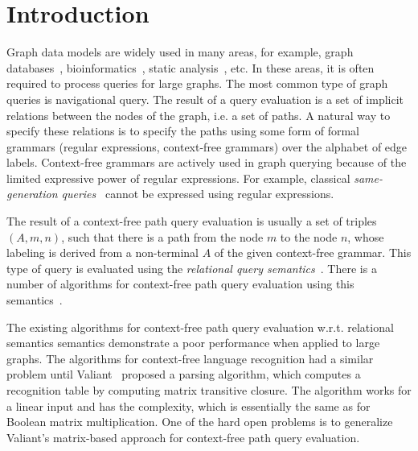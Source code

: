 \section{Introduction}

Graph data models are widely used in many areas, for example, graph databases~\cite{graphDB}, bioinformatics~\cite{Bio}, static analysis~\cite{XXX}, etc. In these areas, it is often required to process queries for large graphs. The most common type of graph queries is navigational query. The result of a query evaluation is a set of implicit relations between the nodes of the graph, i.e. a set of paths. A natural way to specify these relations is to specify the paths using some form of formal grammars (regular expressions, context-free grammars) over the alphabet of edge labels. Context-free grammars are actively used in graph querying because of the limited expressive power of regular expressions. For example, classical \textit{same-generation queries}~\cite{FndDB} cannot be expressed using regular expressions.

The result of a context-free path query evaluation is usually a set of triples \mbox{$(A, m, n)$}, such that there is a path from the node $m$ to the node $n$, whose labeling is derived from a non-terminal $A$ of the given context-free grammar. This type of query is evaluated using the \textit{relational query semantics}~\cite{hellingsRelational}. There is a number of algorithms for context-free path query evaluation using this semantics~\cite{GLL, hellingsRelational, RDF, GraphQueryWithEarley}.

The existing algorithms for context-free path query evaluation w.r.t. relational semantics semantics demonstrate a poor performance when applied to large graphs. The algorithms for context-free language recognition had a similar problem until Valiant~\cite{valiant} proposed a parsing algorithm, which computes a recognition table by computing matrix transitive closure. The algorithm works for a linear input and has the complexity, which is essentially the same as for Boolean matrix multiplication. One of the hard open problems is to generalize Valiant's matrix-based approach for context-free path query evaluation.

